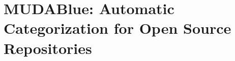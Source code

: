 



\section{MUDABlue: Automatic Categorization for Open Source Repositories}\label{sec:mudablue}


